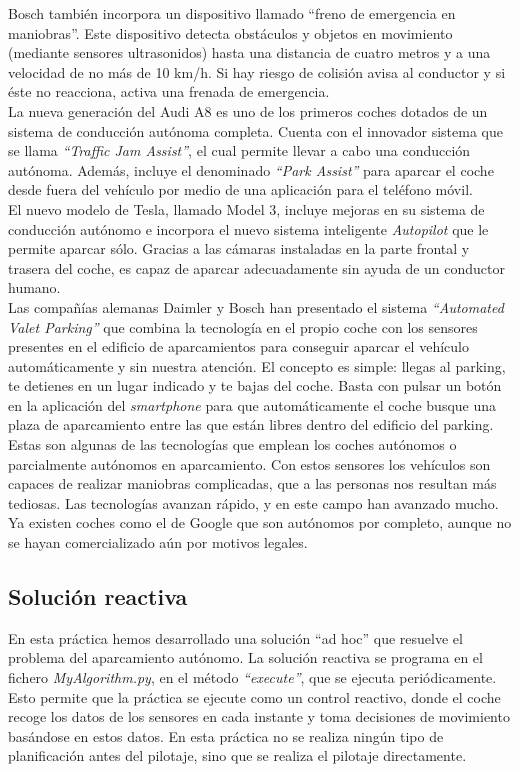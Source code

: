 Bosch también incorpora un dispositivo llamado ``freno de emergencia en maniobras''. Este dispositivo detecta obstáculos y objetos en movimiento (mediante sensores ultrasonidos) hasta una distancia de cuatro metros y a una velocidad de no más de 10 km/h. Si hay riesgo de colisión avisa al conductor y si éste no reacciona, activa una frenada de emergencia.\\

La nueva generación del Audi A8 es uno de los primeros coches dotados de un sistema de conducción autónoma completa. Cuenta con el innovador sistema que se llama \textit{``Traffic Jam Assist''}, el cual permite llevar a cabo una conducción autónoma. Además, incluye el denominado \textit{``Park Assist''} para aparcar el coche desde fuera del vehículo por medio de una aplicación para el teléfono móvil.\\

El nuevo modelo de Tesla, llamado Model 3, incluye mejoras en su sistema de conducción autónomo e incorpora el nuevo sistema inteligente \textit{Autopilot} que le permite aparcar sólo. Gracias a las cámaras instaladas en la parte frontal y trasera del coche, es capaz de aparcar adecuadamente sin ayuda de un conductor humano.\\

Las compañías alemanas Daimler y Bosch han presentado el sistema \textit{“Automated Valet Parking”} que combina la tecnología en el propio coche con los sensores presentes en el edificio de aparcamientos para conseguir aparcar el vehículo automáticamente y sin nuestra atención. El concepto es simple: llegas al parking, te detienes en un lugar indicado y te bajas del coche. Basta con pulsar un botón en la aplicación del \textit{smartphone} para que automáticamente el coche busque una plaza de aparcamiento entre las que están libres dentro del edificio del parking.\\

Estas son algunas de las tecnologías que emplean los coches autónomos o parcialmente autónomos en aparcamiento. Con estos sensores los vehículos son capaces de realizar maniobras complicadas, que a las personas nos resultan más tediosas. Las tecnologías avanzan rápido, y en este campo han avanzado mucho. Ya existen coches como el de Google que son autónomos por completo, aunque no se hayan comercializado aún por motivos legales. 

\subsection{Solución reactiva}
En esta práctica hemos desarrollado una solución ``ad hoc'' que resuelve el problema del aparcamiento autónomo. La solución reactiva se programa en el fichero \textit{MyAlgorithm.py}, en el método \textit{``execute''}, que se ejecuta periódicamente. Esto permite que la práctica se ejecute como un control reactivo, donde el coche recoge los datos de los sensores en cada instante y toma decisiones de movimiento basándose en estos datos. En esta práctica no se realiza ningún tipo de planificación antes del pilotaje, sino que se realiza el pilotaje directamente.\\


